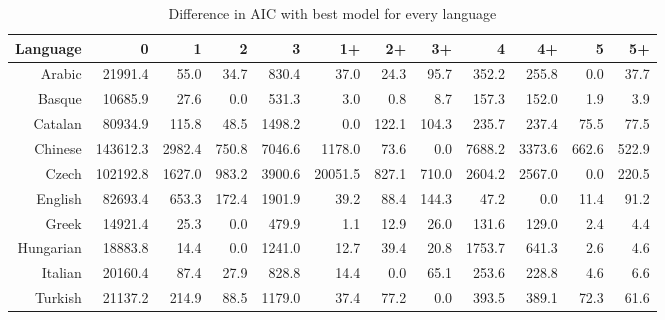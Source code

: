 \documentclass[paper=a4, fontsize=11pt]{scrartcl} %
\begin{document}
\begin{table}
\begin{adjustbox}{center}
\centering
\begin{tabular}{rrrrrrrrrrrr}
 Language & 0 & 1 & 2 & 3 & 1+ & 2+ & 3+ & 4 & 4+ & 5 & 5+ \\ 
  \midrule
Arabic & 21991.4 & 55.0 & 34.7 & 830.4 & 37.0 & 24.3 & 95.7 & 352.2 & 255.8 & 0.0 & 37.7 \\ 
  Basque & 10685.9 & 27.6 & 0.0 & 531.3 & 3.0 & 0.8 & 8.7 & 157.3 & 152.0 & 1.9 & 3.9 \\ 
  Catalan & 80934.9 & 115.8 & 48.5 & 1498.2 & 0.0 & 122.1 & 104.3 & 235.7 & 237.4 & 75.5 & 77.5 \\ 
  Chinese & 143612.3 & 2982.4 & 750.8 & 7046.6 & 1178.0 & 73.6 & 0.0 & 7688.2 & 3373.6 & 662.6 & 522.9 \\ 
  Czech & 102192.8 & 1627.0 & 983.2 & 3900.6 & 20051.5 & 827.1 & 710.0 & 2604.2 & 2567.0 & 0.0 & 220.5 \\ 
  English & 82693.4 & 653.3 & 172.4 & 1901.9 & 39.2 & 88.4 & 144.3 & 47.2 & 0.0 & 11.4 & 91.2 \\ 
  Greek & 14921.4 & 25.3 & 0.0 & 479.9 & 1.1 & 12.9 & 26.0 & 131.6 & 129.0 & 2.4 & 4.4 \\ 
  Hungarian & 18883.8 & 14.4 & 0.0 & 1241.0 & 12.7 & 39.4 & 20.8 & 1753.7 & 641.3 & 2.6 & 4.6 \\ 
  Italian & 20160.4 & 87.4 & 27.9 & 828.8 & 14.4 & 0.0 & 65.1 & 253.6 & 228.8 & 4.6 & 6.6 \\ 
  Turkish & 21137.2 & 214.9 & 88.5 & 1179.0 & 37.4 & 77.2 & 0.0 & 393.5 & 389.1 & 72.3 & 61.6 \\ 
   \bottomrule
\end{tabular}
\end{adjustbox}
\caption{Difference in AIC with best model for every language}
\label{tab:daic}
\end{table}
\end{document}

